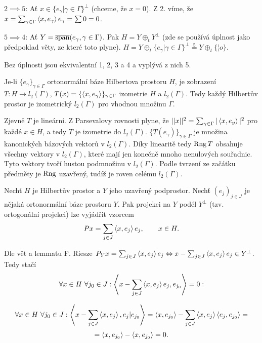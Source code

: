 \documentclass[12pt]{article}					%
\begin{document}
\begin{veta}
\begin{dukazin}
		$2 \implies 5$: Ať $x \in \{e_\gamma | \gamma \in \Gamma\}^{\perp}$ (chceme, že $x = 0$). Z 2. víme, že $x = \sum_{\gamma \in \Gamma}\left\langle x, e_\gamma\right\rangle e_\gamma = \sum 0 = 0$.

		$5 \implies 4$: Ať $Y = \overline{\operatorname{span}}(e_\gamma, \gamma \in \Gamma)$. Pak $H = Y \oplus_t Y^{\perp}$ (zde se používá úplnost jako předpoklad věty, ze které toto plyne). $H = Y \oplus_t \{e_\gamma | \gamma \in \Gamma\}^\perp \overset{5}{=} Y \oplus_t \{¦o\}$.
	\end{dukazin}

	\begin{poznamka}
		Bez úplnosti jsou ekvivalentní 1, 2, 3 a 4 a vyplývá z nich 5.
	\end{poznamka}
\end{veta}


\begin{veta}
	Je-li $\{e_\gamma\}_{\gamma \in \Gamma}$ ortonormální báze Hilbertova prostoru $H$, je zobrazení $T: H \rightarrow l_2(\Gamma)$, $T(x) = \{\left\langle x, e_\gamma\right\rangle\}_{\gamma \in \Gamma}$ izometrie $H$ a $l_2(\Gamma)$. Tedy každý Hilbertův prostor je izometrický $l_2(\Gamma)$ pro vhodnou množinu $\Gamma$.

	\begin{dukazin}[Ze skript]
		Zjevně $T$ je lineární. Z Parsevalovy rovnosti plyne, že $||x||^2 = \sum_{\gamma \in \Gamma} |\left\langle x, e_y\right\rangle|^2$ pro každé $x \in H$, a tedy $T$ je izometrie do $l_2(\Gamma)$. $\{T(e_\gamma)\}_{\gamma \in \Gamma}$ je množina kanonických bázových vektorů v $l_2(\Gamma)$. Díky linearitě tedy $\operatorname{Rng} T$ obsahuje všechny vektory v $l_2(\Gamma)$, které mají jen konečně mnoho nenulových souřadnic. Tyto vektory tvoří hustou podmnožinu v $l_2(\Gamma)$. Podle tvrzení ze začátku předměty je $\operatorname{Rng}$ uzavřený, tudíž je roven celému $l_2(\Gamma)$.
	\end{dukazin}
\end{veta}

\begin{veta}
	Nechť $H$ je Hilbertův prostor a $Y$ jeho uzavřený podprostor. Nechť $(e_j)_{j \in J}$ je nějaká ortonormální báze prostoru $Y$. Pak projekci na $Y$ podél $Y^\perp$ (tzv. ortogonální projekci) lze vyjádřit vzorcem
	$$ Px = \sum_{j \in J}\left\langle x, e_j\right\rangle e_j, \qquad x \in H. $$

	\begin{dukazin}
		Dle vět a lemmatu F. Riesze $P_Y x = \sum_{j \in J}\left\langle x, e_j\right\rangle e_j \Leftrightarrow x - \sum_{j \in J} \left\langle x, e_j\right\rangle e_j \in Y^\perp$. Tedy stačí
		$$ \forall x \in H\ \forall j_0 \in J: \left\langle x - \sum_{j \in J}\left\langle x, e_j\right\rangle e_j, e_{j_0}\right\rangle = 0: $$

		$$ \forall x \in H\ \forall j_0 \in J: \left\langle x - \sum_{j \in J}\left\langle x, e_j\right\rangle, e_j | e_{j_0}\right\rangle = \left\langle x, e_{j_0}\right\rangle - \sum_{j \in J}\left\langle x, e_j\right\rangle\left\langle e_j, e_{j_0}\right\rangle = $$
		$$ = \left\langle x, e_{j_0}\right\rangle - \left\langle x, e_{j_0}\right\rangle = 0. $$
	\end{dukazin}
\end{veta}
\end{document}
